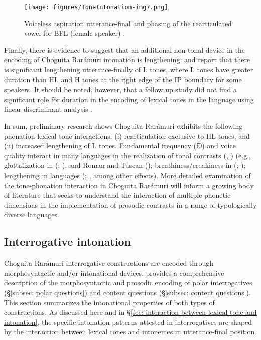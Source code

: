 \begin{figure}
\texttt{[image: figures/ToneIntonation-img7.png]}
\caption{
\label{fig: phasing of creaak aand aspiration}
Voiceless aspiration utterance-final and phasing of the rearticulated vowel for BFL (female speaker) \parencite{caballero2014tone}.}
\end{figure}

Finally, there is evidence to suggest that an additional non-tonal device in the encoding of Choguita Rarámuri intonation is lengthening: \citet{caballero2014tone} and \citet{aguilar2015multi} report that there is significant lengthening utterance-finally of L tones, where L tones have greater duration than HL and H tones at the right edge of the IP boundary for some speakers. It should be noted, however, that a follow up study did not find a significant role for duration in the encoding of lexical tones in the language using linear discriminant analysis \citep{kubuzono2020raramuri}.

In sum, preliminary research shows Choguita Rarámuri exhibits the following phonation-lexical tone interactions: (i) rearticulation exclusive to HL tones, and (ii) increased lengthening of L tones. Fundamental frequency (f0) and voice quality interact in many languages in the realization of tonal contrasts (\citealt{kingston2005phonetics}, \citealt{kuang2013tonal}) (e.g., glottalization in  (; \citealt{hyman1993structure}), and Roman and Tuscan  (\citealt{di2015glottalization}); breathiness/creakiness in  (; \citealt{gordon2005autosegmental}); lengthening in  languages (\citealt{downing2008focus,downing2010accent}; \citealt{hyman2011tonal}, among other effects). More detailed examination of the tone-phonation interaction in Choguita Rarámuri will inform a growing body of literature that seeks to understand the interaction of multiple phonetic dimensions in the implementation of prosodic contrasts in a range of typologically diverse languages.

\subsection{Interrogative intonation}
\label{sec: interrogative intonation}

Choguita Rarámuri interrogative constructions are encoded through morphosyntactic and/or intonational devices.  provides a comprehensive description of the morphosyntactic and prosodic encoding of polar interrogatives (§\ref{subsec: polar questions}) and content questions (§\ref{subsec: content questions}). This section summarizes the intonational properties of both types of constructions. As discussed here and in §\ref{sec: interaction between lexical tone and intonation}, the specific intonation patterns attested in interrogatives are shaped by the interaction between lexical tones and intonemes in utterance-final position.

